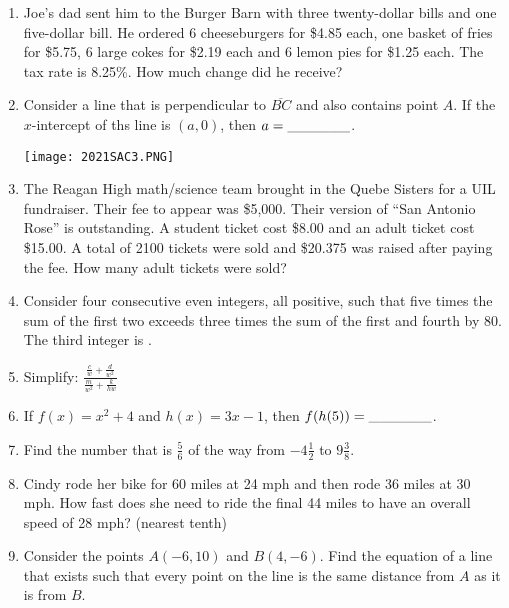 \documentclass[../uilmath.tex]{subfiles}
\begin{document}
\begin{enumerate}[label=\bfseries\arabic*.]
    \item %
    Joe's dad sent him to the Burger Barn with three twenty-dollar bills and one five-dollar bill. He ordered 6 
    cheeseburgers for \$4.85 each, one basket of fries for \$5.75, 6 large cokes for \$2.19 each and 6 lemon pies for \$1.25 each.
    The tax rate is 8.25\%. How much change did he receive?

    \item %
    Consider a line that is perpendicular to $\overline{BC}$ and also contains point $A$. If the $x$-intercept of ths line is $(a,0)$, then $a=\_\_\_\_\_\_$.
    \begin{center}
        \texttt{[image: 2021SAC3.PNG]}
    \end{center}

    \item %
    The Reagan High math/science team brought in the Quebe Sisters for a UIL fundraiser. Their fee to appear was \$5,000.
    Their version of ``San Antonio Rose'' is outstanding. A student ticket cost \$8.00 and an adult ticket cost \$15.00. A total of 
    2100 tickets were sold and \$20.375 was raised after paying the fee. How many adult tickets were sold?

    \item %
    Consider four consecutive even integers, all positive, such that five times the sum of the first two exceeds three times the sum of the first and fourth by 80. The third integer is \blank.

    \item %
    Simplify: $\frac{\frac{c}{w}+\frac{d}{w^2}}{\frac{m}{w^2}+\frac{k}{hw}}$

    \item %
    If $f(x)=x^2+4$ and $h(x)=3x-1$, then $f(h(5))=\_\_\_\_\_\_$.

    \item %
    Find the number that is $\frac{5}{6}$ of the way from $-4\frac{1}{2}$ to $9\frac{3}{8}$.

    \item %
    Cindy rode her bike for 60 miles at 24 mph and then rode 36 miles at 30 mph. How fast does she need to ride 
    the final 44 miles to have an overall speed of 28 mph? (nearest tenth)

    \item %
    Consider the points $A(-6,10)$ and $B(4,-6)$. Find the equation of a line that exists such that every point on the line 
    is the same distance from $A$ as it is from $B$.


\end{enumerate}
\end{document}
